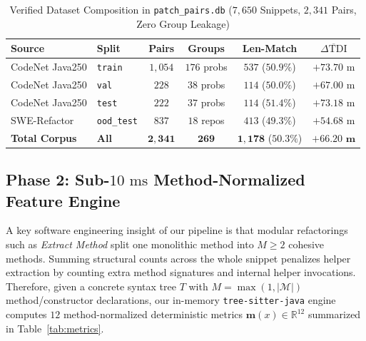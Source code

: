 \documentclass[conference]{IEEEtran}
\begin{document}
\begin{table}[t]
\centering
\caption{Verified Dataset Composition in \texttt{patch\_pairs.db} ($7{,}650$ Snippets, $2{,}341$ Pairs, Zero Group Leakage)}
\label{tab:dataset}
\setlength{\tabcolsep}{3.5pt}
\renewcommand{\arraystretch}{1.15}
\begin{tabular}{@{}llcccc@{}}
\toprule
\textbf{Source} & \textbf{Split} & \textbf{Pairs} & \textbf{Groups} & \textbf{Len-Match} & $\overline{\Delta\text{TDI}}$ \\
\midrule
CodeNet Java250 & \texttt{train} & $1{,}054$ & $176$ probs & $537$ ($50.9\%$) & $+73.70\text{ m}$ \\
CodeNet Java250 & \texttt{val}   & $228$     & $38$ probs  & $114$ ($50.0\%$) & $+67.00\text{ m}$ \\
CodeNet Java250 & \texttt{test}  & $222$     & $37$ probs  & $114$ ($51.4\%$) & $+73.18\text{ m}$ \\
SWE-Refactor    & \texttt{ood\_test} & $837$ & $18$ repos  & $413$ ($49.3\%$) & $+54.68\text{ m}$ \\
\midrule
\textbf{Total Corpus} & \textbf{All} & $\mathbf{2{,}341}$ & $\mathbf{269}$ & $\mathbf{1{,}178}$ ($\mathbf{50.3\%}$) & $\mathbf{+66.20\text{ m}}$ \\
\bottomrule
\end{tabular}
\end{table}

\subsection{Phase 2: Sub-$10\text{ ms}$ Method-Normalized Feature Engine}
A key software engineering insight of our pipeline is that modular refactorings such as \textit{Extract Method} split one monolithic method into $M \ge 2$ cohesive methods. Summing structural counts across the whole snippet penalizes helper extraction by counting extra method signatures and internal helper invocations. Therefore, given a concrete syntax tree $T$ with $M = \max(1, |\mathcal{M}|)$ method/constructor declarations, our in-memory \texttt{tree-sitter-java} engine computes $12$ method-normalized deterministic metrics $\mathbf{m}(x) \in \mathbb{R}^{12}$ summarized in Table~\ref{tab:metrics}.
\end{document}
